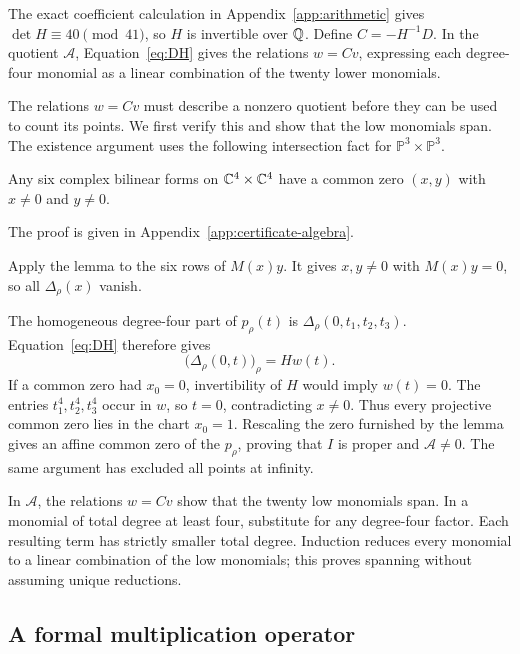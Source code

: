 The exact coefficient calculation in Appendix~\ref{app:arithmetic} gives
$\det H\equiv40\pmod{41}$, so $H$ is invertible over $\mathbb Q$.  Define
$C=-H^{-1}D$.  In the quotient $\mathcal A$, Equation~\eqref{eq:DH} gives
the relations $w=Cv$, expressing each degree-four monomial as a linear
combination of the twenty lower monomials.

The relations $w=Cv$ must describe a nonzero quotient before they can
be used to count its points.  We first verify this and show that the low
monomials span.  The existence argument uses the following intersection
fact for $\mathbb P^3\times\mathbb P^3$.

\begin{lemma}\label{lem:six-bilinear}
Any six complex bilinear forms on $\mathbb C^4\times\mathbb C^4$ have a common zero
$(x,y)$ with $x\ne0$ and $y\ne0$.
\end{lemma}

The proof is given in Appendix~\ref{app:certificate-algebra}.

Apply the lemma to the six rows of
$M(x)y$.  It gives $x,y\ne0$ with $M(x)y=0$, so all $\Delta_\rho(x)$
vanish.

The homogeneous degree-four part of $p_\rho(t)$ is
$\Delta_\rho(0,t_1,t_2,t_3)$.  Equation~\eqref{eq:DH} therefore gives
\[
 \bigl(\Delta_\rho(0,t)\bigr)_\rho=Hw(t).
\]
If a common zero had $x_0=0$, invertibility of $H$ would imply $w(t)=0$.
The entries $t_1^4,t_2^4,t_3^4$ occur in $w$, so $t=0$, contradicting
$x\ne0$.  Thus every projective common zero lies in the chart $x_0=1$.
Rescaling the zero furnished by the lemma gives an affine common zero of
the $p_\rho$, proving that $I$ is proper and $\mathcal A\ne0$.  The same
argument has excluded all points at infinity.

In $\mathcal A$, the relations $w=Cv$ show that the twenty low monomials
span.  In a monomial of total degree at least four, substitute for any
degree-four factor.  Each resulting term has strictly smaller total
degree.  Induction reduces every monomial to a linear combination of
the low monomials; this proves spanning without assuming unique
reductions.

\subsection{A formal multiplication operator}

